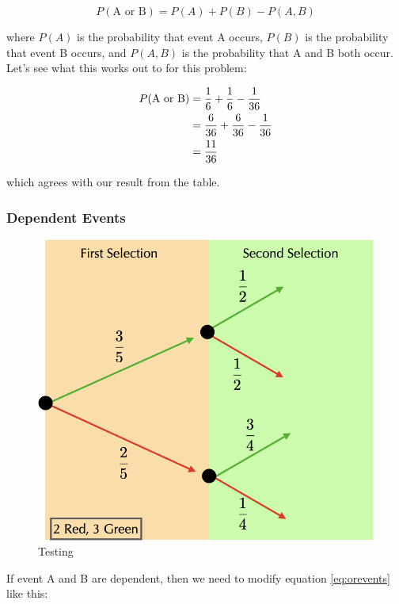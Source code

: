  \begin{equation}
   P(\text{A or B}) = P(A) + P(B) - P(A,B)\label{eq:orevents}
\end{equation}
 
where $P(A)$ is the probability that event A occurs, $P(B)$ is the
probability that event B occurs, and $P(A,B)$ is the probability that
A and B both occur. Let's see what this works out to for this problem:


 \begin{align}
   P(\text{A or B}) &= {1\over 6} + {1\over 6} - {1\over 36}\\
                    &= {6\over 36} + {6\over 36} - {1\over 36}\\
                    &= {11\over 36}\\
 \end{align}

 which agrees with our result from the table.

 \subsubsection*{Dependent Events}

 \begin{figure}
   \includegraphics[scale = 0.3]{Figures/treeDiagram.png}
   \caption{Testing \label{fig:tree}}
   \end{figure}

 If event A and B are dependent, then we need to modify equation
 \eqref{eq:orevents} like this:

